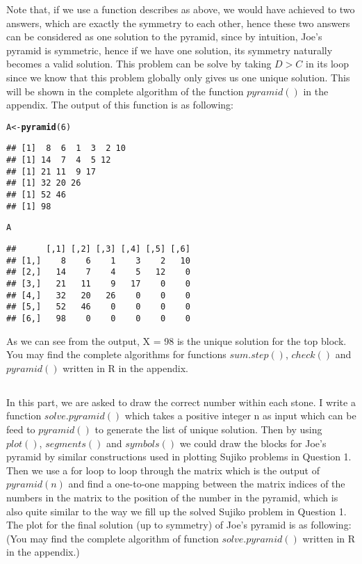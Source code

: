 \documentclass[12pt]{article}\usepackage[]{graphicx}\usepackage[]{color}
\makeatletter
\newcommand{\hlnum}[1]{\textcolor[rgb]{0.686,0.059,0.569}{#1}}%
\newcommand{\hlstd}[1]{\textcolor[rgb]{0.345,0.345,0.345}{#1}}%
\newcommand{\hlkwb}[1]{\textcolor[rgb]{0.69,0.353,0.396}{#1}}%
\newcommand{\hlkwd}[1]{\textcolor[rgb]{0.737,0.353,0.396}{\textbf{#1}}}%
\newenvironment{kframe}{%
 \def\at@end@of@kframe{}%
 \ifinner\ifhmode%
  \def\at@end@of@kframe{\end{minipage}}%
  \begin{minipage}{\columnwidth}%
 \fi\fi%
 \def\FrameCommand##1{\hskip\@totalleftmargin \hskip-\fboxsep
 \colorbox{shadecolor}{##1}\hskip-\fboxsep
     \hskip-\linewidth \hskip-\@totalleftmargin \hskip\columnwidth}%
 \MakeFramed {\advance\hsize-\width
   \@totalleftmargin\z@ \linewidth\hsize
   \@setminipage}}%
 {\par\unskip\endMakeFramed%
 \at@end@of@kframe}
\newenvironment{knitrout}{}{} %
\makeatother
\begin{document}
Note that, if we use a function describes as above, we would have achieved to two answers, which are exactly the symmetry to each other, hence these two answers can be considered as one solution to the pyramid, since by intuition, Joe's pyramid is symmetric, hence if we have one solution, its symmetry naturally becomes a valid solution. This problem can be solve by taking $D > C$ in its loop since we know that this problem globally only gives us one unique solution. This will be shown in the complete algorithm of the function $pyramid()$ in the appendix.
The output of this function is as following:


\begin{knitrout}
\color{fgcolor}\begin{kframe}
\begin{alltt}
\hlstd{A} \hlkwb{<-} \hlkwd{pyramid}\hlstd{(}\hlnum{6}\hlstd{)}
\end{alltt}
\begin{verbatim}
## [1]  8  6  1  3  2 10
## [1] 14  7  4  5 12
## [1] 21 11  9 17
## [1] 32 20 26
## [1] 52 46
## [1] 98
\end{verbatim}
\begin{alltt}
\hlstd{A}
\end{alltt}
\begin{verbatim}
##      [,1] [,2] [,3] [,4] [,5] [,6]
## [1,]    8    6    1    3    2   10
## [2,]   14    7    4    5   12    0
## [3,]   21   11    9   17    0    0
## [4,]   32   20   26    0    0    0
## [5,]   52   46    0    0    0    0
## [6,]   98    0    0    0    0    0
\end{verbatim}
\end{kframe}
\end{knitrout}
As we can see from the output, X = 98  is the unique solution for the top block.\\
You may find the complete algorithms for functions $sum.step()$, $check()$ and $pyramid()$ written in R in the appendix. 
\subsection{}
In this part, we are asked to draw the correct number within each stone. I write a function $solve.pyramid()$ which takes a positive integer n as input which can be feed to $pyramid()$ to generate the list of unique solution. Then by using $plot()$, $segments()$ and $symbols()$ we could draw the blocks for Joe's pyramid by similar constructions used in plotting Sujiko problems in Question 1. Then we use a for loop to loop through the matrix which is the output of $pyramid(n)$ and find a one-to-one mapping between the matrix indices of the numbers in the matrix to the position of the number in the pyramid, which is also quite similar to the way we fill up the solved Sujiko problem in Question 1.\\
The plot for the final solution (up to symmetry) of Joe's pyramid is as following: (You may find the complete algorithm of function $solve.pyramid()$ written in R in the appendix.)\\
\end{document}
